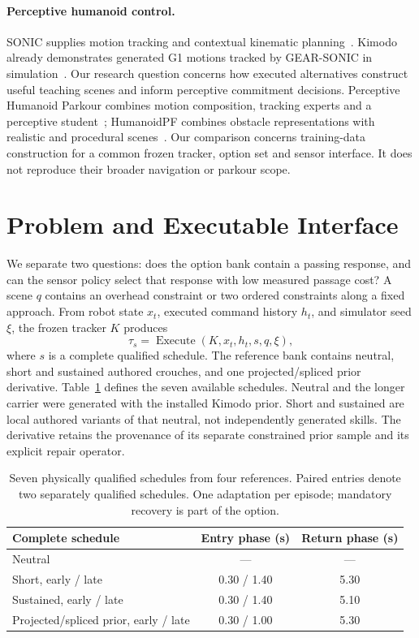 \documentclass[10pt]{article}
\begin{document}
\paragraph{Perceptive humanoid control.}
SONIC supplies motion tracking and contextual kinematic planning~\cite{sonic}.
Kimodo already demonstrates generated G1 motions tracked by GEAR-SONIC in
simulation~\cite{kimodo}. Our research question concerns how executed alternatives
construct useful teaching scenes and inform perceptive commitment decisions.
Perceptive Humanoid Parkour combines motion composition, tracking experts and a
perceptive student~\cite{php}; HumanoidPF combines obstacle representations with
realistic and procedural scenes~\cite{humanoidpf}. Our comparison concerns
training-data construction for a common frozen tracker, option set and sensor
interface. It does not reproduce their broader navigation or parkour scope.

\section{Problem and Executable Interface}
We separate two questions: does the option bank contain a passing response, and
can the sensor policy select that response with low measured passage cost? A
scene $q$ contains an overhead constraint or two ordered constraints along a
fixed approach. From robot state $x_t$, executed command history $h_t$, and
simulator seed $\xi$, the frozen tracker $K$ produces
\begin{equation}
 \tau_s=\operatorname{Execute}(K,x_t,h_t,s,q,\xi),
\end{equation}
where $s$ is a complete qualified schedule. The reference bank contains neutral,
short and sustained authored crouches, and one projected/spliced prior derivative.
Table~\ref{tab:schedules} defines the seven available schedules. Neutral and the
longer carrier were generated with the installed Kimodo prior. Short and sustained
are local authored variants of that neutral, not independently generated skills.
The derivative retains the provenance of its separate constrained prior sample
and its explicit repair operator.

\begin{table}[t]
\centering\small
\begin{tabular}{lcc}
\toprule
Complete schedule & Entry phase (s) & Return phase (s) \\
\midrule
Neutral & --- & --- \\
Short, early / late & 0.30 / 1.40 & 5.30 \\
Sustained, early / late & 0.30 / 1.40 & 5.10 \\
Projected/spliced prior, early / late & 0.30 / 1.00 & 5.30 \\
\bottomrule
\end{tabular}
\caption{Seven physically qualified schedules from four references. Paired
entries denote two separately qualified schedules. One adaptation per episode;
mandatory recovery is part of the option.}
\label{tab:schedules}
\end{table}
\end{document}
